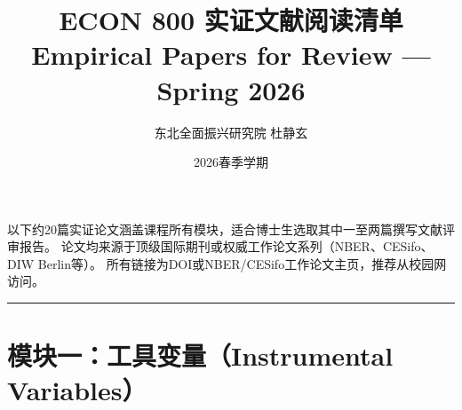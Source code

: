 \documentclass[12pt, a4paper]{article}
\title{\textbf{ECON 800 实证文献阅读清单}\\[0.5em]
       \large Empirical Papers for Review --- Spring 2026}
\author{东北全面振兴研究院 \quad 杜静玄}
\date{2026春季学期}
\begin{document}
\maketitle

\noindent 以下约20篇实证论文涵盖课程所有模块，适合博士生选取其中一至两篇撰写文献评审报告。
论文均来源于顶级国际期刊或权威工作论文系列（NBER、CESifo、DIW Berlin等）。
所有链接为DOI或NBER/CESifo工作论文主页，推荐从校园网访问。

\bigskip
\noindent\rule{\linewidth}{0.4pt}

\section*{模块一：工具变量（Instrumental Variables）}
\end{document}
